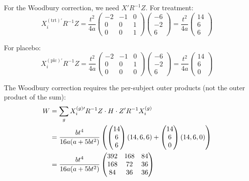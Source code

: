 \documentclass[
  11pt,
]{article}
\begin{document}
For the Woodbury correction, we need \(X'R^{-1}Z\). For treatment: \[
  X_i^{(\text{trt})\prime}R^{-1}Z
  = \frac{t^2}{4a}\begin{pmatrix}-2&-1&0\\0&0&1\\0&0&1
  \end{pmatrix}
  \begin{pmatrix}-6\\-2\\6\end{pmatrix}
  = \frac{t^2}{4a}\begin{pmatrix}14\\6\\6\end{pmatrix}
\]

For placebo: \[
  X_i^{(\text{plc})\prime}R^{-1}Z
  = \frac{t^2}{4a}\begin{pmatrix}-2&-1&0\\0&0&1\\0&0&0
  \end{pmatrix}
  \begin{pmatrix}-6\\-2\\6\end{pmatrix}
  = \frac{t^2}{4a}\begin{pmatrix}14\\6\\0\end{pmatrix}
\]

The Woodbury correction requires the per-subject outer products (not the
outer product of the sum): \begin{align}
  W &= \sum_{g} X_i^{(g)\prime} R^{-1} Z
    \cdot H \cdot
    Z' R^{-1} X_i^{(g)} \notag \\
  &= \frac{bt^4}{16a(a+5bt^2)}
    \left(
      \begin{pmatrix}14\\6\\6\end{pmatrix}
      (14,6,6)
      + \begin{pmatrix}14\\6\\0\end{pmatrix}
      (14,6,0)
    \right) \notag \\
  &= \frac{bt^4}{16a(a+5bt^2)}
    \begin{pmatrix}
      392 & 168 & 84 \\
      168 & 72 & 36 \\
      84 & 36 & 36
    \end{pmatrix}
\end{align}
\end{document}
